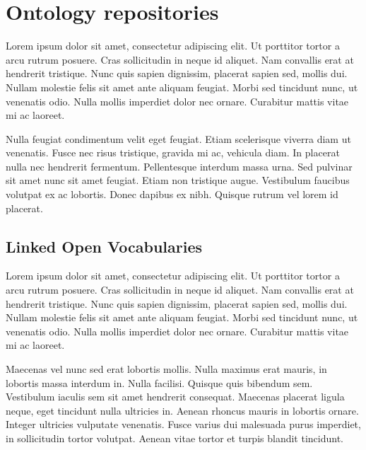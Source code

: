 
\section{Ontology repositories} %
\label{sub:ontology_repositories}

Lorem ipsum dolor sit amet, consectetur adipiscing elit. Ut porttitor tortor a arcu rutrum posuere. Cras sollicitudin in neque id aliquet. Nam convallis erat at hendrerit tristique. Nunc quis sapien dignissim, placerat sapien sed, mollis dui. Nullam molestie felis sit amet ante aliquam feugiat. Morbi sed tincidunt nunc, ut venenatis odio. Nulla mollis imperdiet dolor nec ornare. Curabitur mattis vitae mi ac laoreet.

Nulla feugiat condimentum velit eget feugiat. Etiam scelerisque viverra diam ut venenatis. Fusce nec risus tristique, gravida mi ac, vehicula diam. In placerat nulla nec hendrerit fermentum. Pellentesque interdum massa urna. Sed pulvinar sit amet nunc sit amet feugiat. Etiam non tristique augue. Vestibulum faucibus volutpat ex ac lobortis. Donec dapibus ex nibh. Quisque rutrum vel lorem id placerat.

\subsection{Linked Open Vocabularies} %
\label{ssub:linked_open_vocabularies}

Lorem ipsum dolor sit amet, consectetur adipiscing elit. Ut porttitor tortor a arcu rutrum posuere. Cras sollicitudin in neque id aliquet. Nam convallis erat at hendrerit tristique. Nunc quis sapien dignissim, placerat sapien sed, mollis dui. Nullam molestie felis sit amet ante aliquam feugiat. Morbi sed tincidunt nunc, ut venenatis odio. Nulla mollis imperdiet dolor nec ornare. Curabitur mattis vitae mi ac laoreet.

Maecenas vel nunc sed erat lobortis mollis. Nulla maximus erat mauris, in lobortis massa interdum in. Nulla facilisi. Quisque quis bibendum sem. Vestibulum iaculis sem sit amet hendrerit consequat. Maecenas placerat ligula neque, eget tincidunt nulla ultricies in. Aenean rhoncus mauris in lobortis ornare. Integer ultricies vulputate venenatis. Fusce varius dui malesuada purus imperdiet, in sollicitudin tortor volutpat. Aenean vitae tortor et turpis blandit tincidunt.


